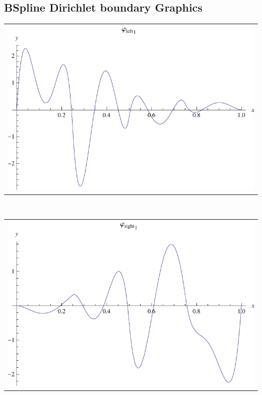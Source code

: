 \documentclass{article}
\begin{document}
\begin{landscape}
\subsection{BSpline Dirichlet boundary Graphics}
\begin{tabular}{c}
\includegraphics[width=20.cm]{biquadratic_bspline_dleft_1.pdf}\end{tabular} 
 \\ 
\begin{tabular}{c}
\includegraphics[width=20.cm]{biquadratic_bspline_dright_1.pdf}\end{tabular} 
 \end{landscape}
\end{document}
